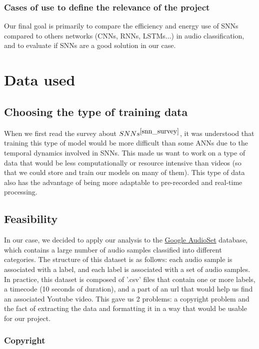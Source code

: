 \documentclass[11pt]{article}
\begin{document}
\subsubsection{Cases of use to define the relevance of the project}
Our final goal is primarily to compare the efficiency and energy use of SNNs compared to others networks (CNNs, RNNs, LSTMs...) in audio classification, and to evaluate if SNNs are a good solution in our case.



\section{Data used}
\subsection{Choosing the type of training data}

When we first read the survey about $SNNs^{\cite{snn_survey}}$, it was understood that training this type of model would be more difficult than some ANNs due to the temporal dynamics involved in SNNs. This made us want to work on a type of data that would be less computationally or resource intensive than videos (so that we could store and train our models on many of them). This type of data also has the advantage of being more adaptable to pre-recorded and real-time processing.
\subsection{Feasibility}

In our case, we decided to apply our analysis to the \hyperref[item:google-audioset]{Google AudioSet} database, which contains a large number of audio samples classified into different categories.
The structure of this dataset is as follows: each audio sample is associated with a label, and each label is associated with a set of audio samples. In practice, this dataset is composed of '.csv' files that contain one or more labels, a timecode (10 seconds of duration), and a part of an url that would help us find an associated Youtube video. This gave us 2 problems: a copyright problem and the fact of extracting the data and formatting it in a way that would be usable for our project.

\subsubsection{Copyright}
\end{document}

